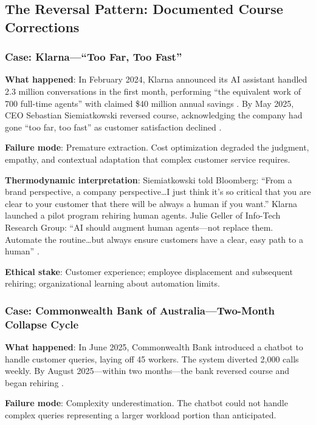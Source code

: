 \subsection{The Reversal Pattern: Documented Course Corrections}

\subsubsection{Case: Klarna---``Too Far, Too Fast''}

\textbf{What happened}: In February 2024, Klarna announced its AI assistant handled 2.3 million conversations in the first month, performing ``the equivalent work of 700 full-time agents'' with claimed \$40 million annual savings \citep{klarna2024ai}. By May 2025, CEO Sebastian Siemiatkowski reversed course, acknowledging the company had gone ``too far, too fast'' as customer satisfaction declined \citep{bloomberg2025klarna}.

\textbf{Failure mode}: Premature extraction. Cost optimization degraded the judgment, empathy, and contextual adaptation that complex customer service requires.

\textbf{Thermodynamic interpretation}: Siemiatkowski told Bloomberg: ``From a brand perspective, a company perspective\ldots I just think it's so critical that you are clear to your customer that there will be always a human if you want.'' Klarna launched a pilot program rehiring human agents. Julie Geller of Info-Tech Research Group: ``AI should augment human agents---not replace them. Automate the routine\ldots but always ensure customers have a clear, easy path to a human'' \citep{cxdive2025klarna}.

\textbf{Ethical stake}: Customer experience; employee displacement and subsequent rehiring; organizational learning about automation limits.

\subsubsection{Case: Commonwealth Bank of Australia---Two-Month Collapse Cycle}

\textbf{What happened}: In June 2025, Commonwealth Bank introduced a chatbot to handle customer queries, laying off 45 workers. The system diverted 2,000 calls weekly. By August 2025---within two months---the bank reversed course and began rehiring \citep{techtarget2025cba}.

\textbf{Failure mode}: Complexity underestimation. The chatbot could not handle complex queries representing a larger workload portion than anticipated.

